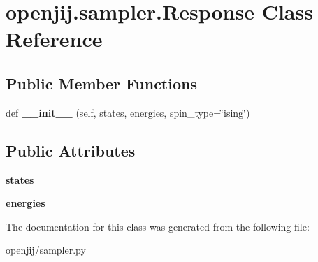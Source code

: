 \hypertarget{classopenjij_1_1sampler_1_1_response}{}\section{openjij.\+sampler.\+Response Class Reference}
\label{classopenjij_1_1sampler_1_1_response}
\subsection*{Public Member Functions}
\begin{DoxyCompactItemize}
\item 
\mbox{\label{classopenjij_1_1sampler_1_1_response_ab6009bfd15d3804a77c5bf95c299015b}} 
def {\bfseries \+\_\+\+\_\+init\+\_\+\+\_\+} (self, states, energies, spin\+\_\+type=\char`\"{}ising\char`\"{})
\end{DoxyCompactItemize}
\subsection*{Public Attributes}
\begin{DoxyCompactItemize}
\item 
\mbox{\label{classopenjij_1_1sampler_1_1_response_aa1e6b636fbde393c85e5f9e84c154398}} 
{\bfseries states}
\item 
\mbox{\label{classopenjij_1_1sampler_1_1_response_a5ff7b574925812407f88da0e03c64ed4}} 
{\bfseries energies}
\end{DoxyCompactItemize}


The documentation for this class was generated from the following file\+:\begin{DoxyCompactItemize}
\item 
openjij/sampler.\+py\end{DoxyCompactItemize}
